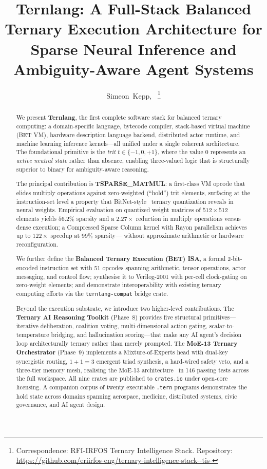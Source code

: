 \documentclass[journal,10pt,twocolumn]{IEEEtran}
\title{Ternlang: A Full-Stack Balanced Ternary Execution Architecture
       for Sparse Neural Inference and Ambiguity-Aware Agent Systems}
\author{Simeon~Kepp,~\IEEEmembership{RFI-IRFOS}%
\thanks{Correspondence: RFI-IRFOS Ternary Intelligence Stack.
Repository: \url{https://github.com/eriirfos-eng/ternary-intelligence-stack--tis-}}%
}
\begin{document}
\maketitle

\begin{abstract}
We present \textbf{Ternlang}, the first complete software stack for
balanced ternary computing: a domain-specific language, bytecode compiler,
stack-based virtual machine (BET VM), hardware description language backend,
distributed actor runtime, and machine learning inference kernels—all unified
under a single coherent architecture. The foundational primitive is the
\emph{trit} $t \in \{-1, 0, +1\}$, where the value $0$ represents an
\emph{active neutral state} rather than absence, enabling three-valued logic
that is structurally superior to binary for ambiguity-aware reasoning.

The principal contribution is \textbf{TSPARSE\_MATMUL}: a first-class VM
opcode that elides multiply operations against zero-weighted (``hold'') trit
elements, surfacing at the instruction-set level a property that
BitNet-style~\cite{ma2024era} ternary quantization reveals in neural weights.
Empirical evaluation on quantized weight matrices of $512 \times 512$
elements yields $56.2\%$ sparsity and a $2.27\times$ reduction in multiply
operations versus dense execution; a Compressed Sparse Column kernel with
Rayon parallelism achieves up to $122\times$ speedup at $99\%$ sparsity—
without approximate arithmetic or hardware reconfiguration.

We further define the \textbf{Balanced Ternary Execution (BET) ISA}, a
formal 2-bit-encoded instruction set with 51 opcodes spanning arithmetic,
tensor operations, actor messaging, and control flow; synthesise it to
Verilog-2001 with per-cell clock-gating on zero-weight elements; and
demonstrate interoperability with existing ternary computing efforts via the
\texttt{ternlang-compat} bridge crate.

Beyond the execution substrate, we introduce two higher-level contributions.
The \textbf{Ternary AI Reasoning Toolkit} (Phase~8) provides five structural
primitives—iterative deliberation, coalition voting, multi-dimensional action
gating, scalar-to-temperature bridging, and hallucination scoring—that make
any AI agent's decision loop architecturally ternary rather than merely
prompted. The \textbf{MoE-13 Ternary Orchestrator} (Phase~9) implements a
Mixture-of-Experts head with dual-key synergistic routing, $1{+}1{=}3$
emergent triad synthesis, a hard-wired safety veto, and a three-tier memory
mesh, realising the MoE-13 architecture~\cite{moe13_2026} in 146 passing
tests across the full workspace. All nine crates are published to
\texttt{crates.io} under open-core licensing. A companion corpus of
twenty executable \texttt{.tern} programs demonstrates the hold state
across domains spanning aerospace, medicine, distributed systems, civic
governance, and AI agent design.
\end{abstract}
\end{document}
